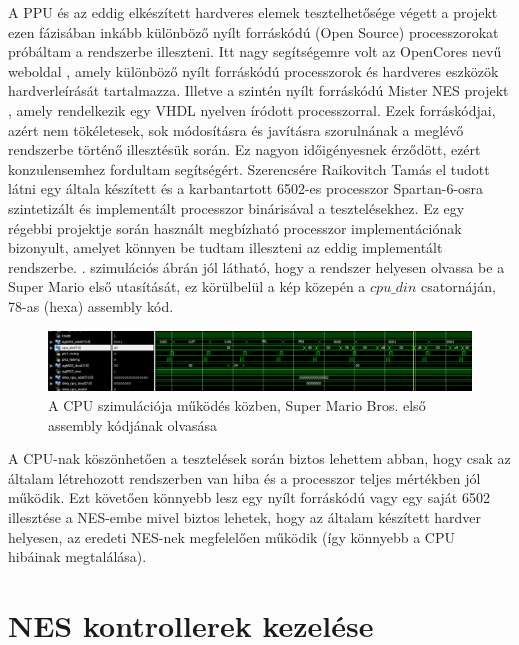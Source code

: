 A PPU és az eddig elkészített hardveres elemek tesztelhetősége végett a projekt ezen fázisában inkább különböző nyílt forráskódú (Open Source) processzorokat próbáltam a rendszerbe illeszteni. Itt nagy segítségemre volt az OpenCores nevű weboldal \cite{OpenCore}, amely különböző nyílt forráskódú processzorok és hardveres eszközök hardverleírását tartalmazza. Illetve a szintén nyílt forráskódú Mister NES projekt \cite{MisterNES}, amely rendelkezik egy VHDL nyelven íródott processzorral. Ezek forráskódjai, azért nem tökéletesek, sok módosításra és javításra szorulnának a meglévő rendszerbe történő illesztésük során. Ez nagyon időigényesnek érződött, ezért konzulensemhez fordultam segítségért. Szerencsére Raikovitch Tamás el tudott látni egy általa készített és a karbantartott 6502-es processzor Spartan-6-osra szintetizált és implementált processzor binárisával a tesztelésekhez. Ez egy régebbi projektje során használt megbízható processzor implementációnak bizonyult, amelyet könnyen be tudtam illeszteni az eddig implementált rendszerbe. . szimulációs ábrán jól látható, hogy a rendszer helyesen olvassa be a Super Mario első utasítását, ez körülbelül a kép közepén a $cpu\_din$ csatornáján, 78-as (hexa) assembly kód. 

\begin{figure}[H]
	\centering
	\includegraphics[width=150mm, keepaspectratio]{figures/working-cpu-simulation}
	\caption{A CPU szimulációja működés közben, Super Mario Bros. első assembly kódjának olvasása} 
	\label{fig:working-cpu-simulation}
\end{figure} 

A CPU-nak köszönhetően a tesztelések során biztos lehettem abban, hogy csak az általam létrehozott rendszerben van hiba és a processzor teljes mértékben jól működik. Ezt követően könnyebb lesz egy nyílt forráskódú vagy egy saját 6502 illesztése a NES-embe mivel biztos lehetek, hogy az általam készített hardver helyesen, az eredeti NES-nek megfelelően működik (így könnyebb a CPU hibáinak megtalálása). 

\section{NES kontrollerek kezelése}

